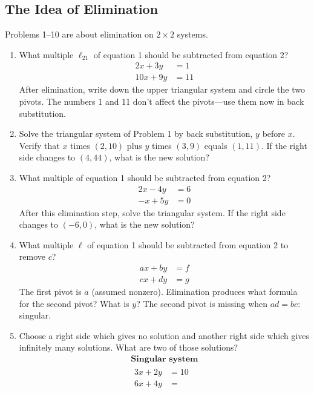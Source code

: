 \documentclass[14pt, a4paper]{article}
\begin{document}
\subsection{The Idea of Elimination}
\noindent Problems 1--10 are about elimination on $2 \times 2$ systems.

\begin{enumerate}
    \item What multiple $\ell_{21}$ of equation 1 should be subtracted from equation 2?
          \[
              \begin{aligned}
                  2x + 3y  & = 1  \\
                  10x + 9y & = 11
              \end{aligned}
          \]
          After elimination, write down the upper triangular system and circle the two pivots.
          The numbers 1 and 11 don’t affect the pivots—use them now in back substitution.

    \item Solve the triangular system of Problem 1 by back substitution, $y$ before $x$.
          Verify that $x$ times $(2,10)$ plus $y$ times $(3,9)$ equals $(1,11)$.
          If the right side changes to $(4,44)$, what is the new solution?

    \item What multiple of equation 1 should be subtracted from equation 2?
          \[
              \begin{aligned}
                  2x - 4y & = 6 \\
                  -x + 5y & = 0
              \end{aligned}
          \]
          After this elimination step, solve the triangular system.
          If the right side changes to $(-6,0)$, what is the new solution?

    \item What multiple $\ell$ of equation 1 should be subtracted from equation 2 to remove $c$?
          \[
              \begin{aligned}
                  ax + by & = f \\
                  cx + dy & = g
              \end{aligned}
          \]
          The first pivot is $a$ (assumed nonzero). Elimination produces what formula for the second pivot? What is $y$? The second pivot is missing when $ad = bc$: singular.

    \item Choose a right side which gives no solution and another right side which gives infinitely many solutions. What are two of those solutions?
          \[
              \begin{array}{c}
                  \textbf{Singular system} \\[0.5em]
                  \begin{aligned}
                      3x + 2y & = 10          \\
                      6x + 4y & = \phantom{1}
                  \end{aligned}
              \end{array}
          \]


\end{enumerate}
\end{document}

